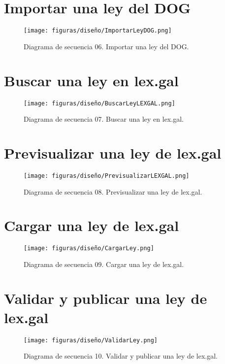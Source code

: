 \section{Importar una ley del DOG}

\begin{figure}[H]
\centerline{\texttt{[image: figuras/diseño/ImportarLeyDOG.png]}}
\caption{Diagrama de secuencia 06. Importar una ley del DOG.}
\label{enlaceDImportarDOG}
\end{figure}


\section{Buscar una ley en lex.gal}

\begin{figure}[H]
\centerline{\texttt{[image: figuras/diseño/BuscarLeyLEXGAL.png]}}
\caption{Diagrama de secuencia 07. Buscar una ley en lex.gal.}
\label{enlaceDBuscarLEXGAL}
\end{figure}


\section{Previsualizar una ley de lex.gal}

\begin{figure}[H]
\centerline{\texttt{[image: figuras/diseño/PrevisualizarLEXGAL.png]}}
\caption{Diagrama de secuencia 08. Previsualizar una ley de lex.gal.}
\label{enlaceDPrevisualizarLEXGAL}
\end{figure}


\section{Cargar una ley de lex.gal}

\begin{figure}[H]
\centerline{\texttt{[image: figuras/diseño/CargarLey.png]}}
\caption{Diagrama de secuencia 09. Cargar una ley de lex.gal.}
\label{enlaceDCargarLEXGAL}
\end{figure}


\section{Validar y publicar una ley de lex.gal}

\begin{figure}[H]
\centerline{\texttt{[image: figuras/diseño/ValidarLey.png]}}
\caption{Diagrama de secuencia 10. Validar y publicar una ley de lex.gal.}
\label{enlaceDBorradorLEXGAL}
\end{figure}


